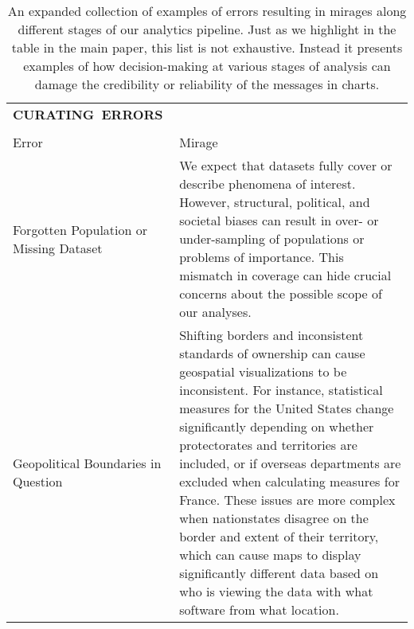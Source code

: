 
  \begin{longtable}{>{\raggedright\arraybackslash}p{3cm}p{14cm}}
    \caption{An expanded collection of examples of errors resulting in mirages along different stages of our analytics pipeline. Just as we highlight in the table in the main paper, this list is not exhaustive. Instead it presents examples of how decision-making at various stages of analysis can damage the credibility or reliability of the messages in charts.}

    
  \\\hbox{\normalsize{\textbf{CURATING ERRORS}}}&\\ \\
  \normalsize{Error} & \normalsize{Mirage}\\ \hline
   \rowcolor{colora}Forgotten Population or Missing Dataset  & We expect that datasets fully cover or describe phenomena of interest. However, structural, political, and societal biases can result in over- or under-sampling of populations or problems of importance. This mismatch in coverage can hide crucial concerns about the possible scope of our analyses. \cite{missingdatasets, dignazio2019draft}\\
 \rowcolor{colora-opaque}Geopolitical Boundaries in Question  & Shifting borders and inconsistent standards of ownership can cause geospatial visualizations to be inconsistent. For instance, statistical measures for the United States change significantly depending on whether protectorates and territories are included, or if overseas departments are excluded when calculating measures for France. These issues are more complex when nationstates disagree on the border and extent of their territory, which can cause maps to display significantly different data based on who is viewing the data with what software from what location. \cite{missingdatasets,soeller2016mapwatch}\\
  


\end{longtable}
